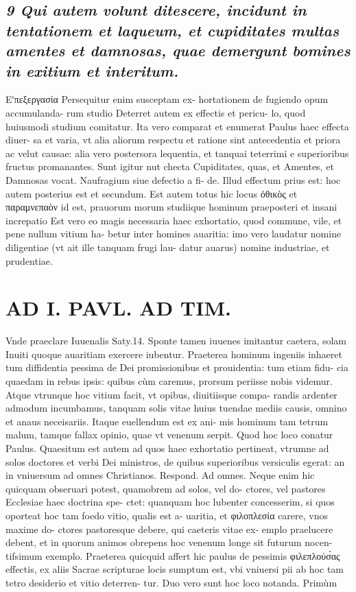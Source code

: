 \documentclass{article}
\begin{document}
\begin{pages}
\subsection*{\textit{9 Qui autem volunt ditescere, incidunt in tentationem et laqueum, et cupiditates multas amentes et damnosas, quae demergunt bomines in exitium et interitum. }}\pstart Εʹπεξεργασία Persequitur enim susceptam ex- hortationem de fugiendo opum accumulanda- rum studio Deterret autem ex effectis et pericu- lo, quod huiusmodi studium comitatur. Ita vero comparat et enumerat Paulus haec effecta diuer- sa et varia, vt alia aliorum respectu et ratione sint antecedentia et priora ac velut causae: alia vero postersora lequentia, et tanquai teterrimi e superioribus fructus promanantes. Sunt igitur nut checta Cupiditates, quas, et Amentes, et Damnosas vocat. Naufragium siue defectio a fi- de. Illud effectum prius est: hoc autem posterius est et secundum.  \pend\pstart Est autem totus hic locus ὀθικὸς et παραμνεπαὸν id est, prauorum morum studiique hominum praeposteri et insani increpatio  \pend\pstart Est vero eo magis necessaria haec exhortatio, quod commune, vile, et pene nullum vitium ha- betur inter homines auaritia: imo vero laudatur nomine diligentiae (vt ait ille tanquam frugi lau- datur auarus) nomine industriae, et prudentiae.  \pend
\section*{AD I. PAVL. AD TIM. }
\marginpar{[ p.44* ]}\pstart Vnde praeclare Iuuenalis Saty.14. Sponte tamen iuuenes imitantur caetera, solam Inuiti quoque auaritiam exercere iubentur. Praeterea hominum ingeniis inhaeret tum diffidentia pessima de Dei promissionibus et prouidentia: tum etiam fidu- cia quaedam in rebus ipsis: quibus cùm caremus, prorsum periisse nobis videmur. Atque vtrunque  hoc vitium facit, vt opibus, diuitiisque compa- randis ardenter admodum incumbamus, tanquam solis vitae huius tuendae mediis causis, omnino et anaus neceisariis. Itaque euellendum est ex ani- mis hominum tam tetrum malum, tamque fallax opinio, quae vt venenum serpit. Quod hoc loco conatur Paulus.  \pend\pstart Quaesitum est autem ad quos haec exhortatio pertineat, vtrumne ad solos doctores et verbi Dei ministros, de quibus superioribus versiculis egerat: an in vniuersum ad omnes Christianos. Respond. Ad omnes. Neque enim hic quicquam obseruari potest, quamobrem ad solos, vel do- ctores, vel pastores Ecclesiae haec doctrina spe- ctet: quanquam hoc lubenter concesserim, si quos oporteat hoc tam foedo vitio, qualis est a- uaritia, et φιλοπλεσία carere, vnos maxime do- ctores pastoresque debere, qui caeteris vitae ex- emplo praelucere debent, et in quorum animos obrepens hoc venenum longe sit futurum nocen- tifsimum exemplo. Praeterea quicquid affert hic paulus de pessimis φιλεπλούσ́ας effectis, ex aliis Sacrae scripturae locis sumptum est, vbi vniuersi pii ab hoc tam tetro desiderio et vitio deterren- tur.  \pend\pstart Duo vero sunt hoc loco notanda. Primùm  \pend

\end{pages}
\end{document}
